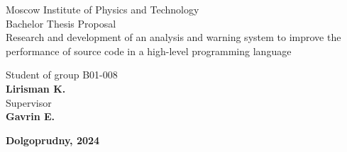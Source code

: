 \documentclass[a4paper]{article}
\begin{document}
\begin{center}
	\hfill \break
	\hfill \break
	{\small Moscow Institute of Physics and Technology}\\
	\hfill \break
	\hfill \break
	\hfill \break
	\hfill \break
	\hfill \break
	\normalsize{Bachelor Thesis Proposal}\\
	\hfill \break
	\hfill \break
	\hfill \break
	\hfill \break
	\hfill \break
	\hfill \break
	\hfill \break
	\hfill \break
	\hfill \break
	\hfill \break
	\large{Research and development of an analysis and warning system to improve the performance of source code in a high-level programming language
	}\\
\end{center}
\hfill \break
\hfill \break
\hfill \break
\hfill \break
\hfill \break
\hfill \break
\hfill \break
\hfill \break


\begin{flushright}
	\normalsize{Student of group B01-008}\\
	\normalsize{\textbf{Lirisman K.}}\\
	\normalsize{Supervisor}\\
	\normalsize{\textbf{Gavrin E.}}\\
	\hfill \break
	\hfill \break
\end{flushright}

\begin{center}
	\normalsize{\textbf{Dolgoprudny, 2024}}
\end{center}


\thispagestyle{empty} %


\newpage

	
\end{document}

